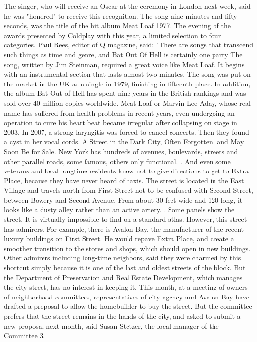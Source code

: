 The singer, who will receive an Oscar at the ceremony in London next week, said he was "honored" to receive this recognition.
The song nine minutes and fifty seconds, was the title of the hit album Meat Loaf 1977.
The evening of the awards presented by Coldplay with this year, a limited selection to four categories.
Paul Rees, editor of Q magazine, said: "There are songs that transcend such things as time and genre, and Bat Out Of Hell is certainly one party
The song, written by Jim Steinman, required a great voice like Meat Loaf.
It begins with an instrumental section that lasts almost two minutes.
The song was put on the market in the UK as a single in 1979, finishing in fifteenth place.
In addition, the album Bat Out of Hell has spent nine years in the British rankings and was sold over 40 million copies worldwide.
Meat Loaf-or Marvin Lee Aday, whose real name-has suffered from health problems in recent years, even undergoing an operation to cure his heart beat became irregular after collapsing on stage in 2003.
In 2007, a strong laryngitis was forced to cancel concerts.
Then they found a cyst in her vocal cords.
A Street in the Dark City, Often Forgotten, and May Soon Be for Sale.
New York has hundreds of avenues, boulevards, streets and other parallel roads, some famous, others only functional.
. And even some veterans and local longtime residents know not to give directions to get to Extra Place, because they have never heard of taxis.
The street is located in the East Village and travels north from First Street-not to be confused with Second Street, between Bowery and Second Avenue.
From about 30 feet wide and 120 long, it looks like a dusty alley rather than an active artery.
. Some panels show the street.
It is virtually impossible to find on a standard atlas.
However, this street has admirers.
For example, there is Avalon Bay, the manufacturer of the recent luxury buildings on First Street.
He would repave Extra Place, and create a smoother transition to the stores and shops, which should open in new buildings.
Other admirers including long-time neighbors, said they were charmed by this shortcut simply because it is one of the last and oldest streets of the block.
But the Department of Preservation and Real Estate Development, which manages the city street, has no interest in keeping it.
This month, at a meeting of owners of neighborhood committees, representatives of city agency and Avalon Bay have drafted a proposal to allow the homebuilder to buy the street.
But the committee prefers that the street remains in the hands of the city, and asked to submit a new proposal next month, said Susan Stetzer, the local manager of the Committee 3.
